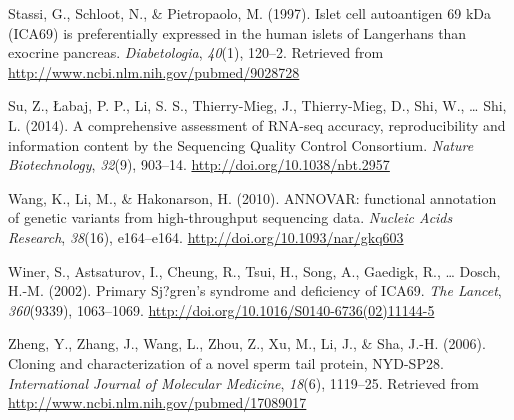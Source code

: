 \documentclass[12pt,twoside]{reedthesis}
\theoremstyle{definition}
\theoremstyle{definition}
\theoremstyle{remark}
\begin{document}
  \hypertarget{ref-Stassi1997}{}
  Stassi, G., Schloot, N., \& Pietropaolo, M. (1997). Islet cell
  autoantigen 69 kDa (ICA69) is preferentially expressed in the human
  islets of Langerhans than exocrine pancreas. \emph{Diabetologia},
  \emph{40}(1), 120--2. Retrieved from
  \url{http://www.ncbi.nlm.nih.gov/pubmed/9028728}
  
  \hypertarget{ref-Su2014}{}
  Su, Z., Łabaj, P. P., Li, S. S., Thierry-Mieg, J., Thierry-Mieg, D.,
  Shi, W., \ldots{} Shi, L. (2014). A comprehensive assessment of RNA-seq
  accuracy, reproducibility and information content by the Sequencing
  Quality Control Consortium. \emph{Nature Biotechnology}, \emph{32}(9),
  903--14. \url{http://doi.org/10.1038/nbt.2957}
  
  \hypertarget{ref-Wang2010}{}
  Wang, K., Li, M., \& Hakonarson, H. (2010). ANNOVAR: functional
  annotation of genetic variants from high-throughput sequencing data.
  \emph{Nucleic Acids Research}, \emph{38}(16), e164--e164.
  \url{http://doi.org/10.1093/nar/gkq603}
  
  \hypertarget{ref-Winer2002}{}
  Winer, S., Astsaturov, I., Cheung, R., Tsui, H., Song, A., Gaedigk, R.,
  \ldots{} Dosch, H.-M. (2002). Primary Sj?gren's syndrome and deficiency
  of ICA69. \emph{The Lancet}, \emph{360}(9339), 1063--1069.
  \url{http://doi.org/10.1016/S0140-6736(02)11144-5}
  
  \hypertarget{ref-Zheng2006}{}
  Zheng, Y., Zhang, J., Wang, L., Zhou, Z., Xu, M., Li, J., \& Sha, J.-H.
  (2006). Cloning and characterization of a novel sperm tail protein,
  NYD-SP28. \emph{International Journal of Molecular Medicine},
  \emph{18}(6), 1119--25. Retrieved from
  \url{http://www.ncbi.nlm.nih.gov/pubmed/17089017}


\end{document}
